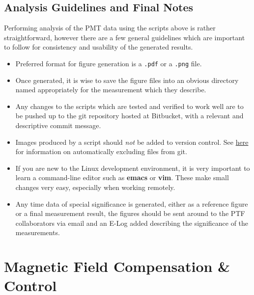 \documentclass[twoside,letterpaper]{refart}
\begin{document}


\clearpage
\subsection{Analysis Guidelines and Final Notes}

Performing analysis of the PMT data using the scripts above is rather straightforward, however there are a few general guidelines which are important to follow for consistency and usability of the generated results.

\begin{itemize}
	\item Preferred format for figure generation is a \texttt{.pdf} or a \texttt{.png} file.
	\item Once generated, it is wise to save the figure files into an obvious directory named appropriately for the measurement which they describe.
	\item Any changes to the scripts which are tested and verified to work well are to be pushed up to the git repository hosted at Bitbucket, with a relevant and descriptive commit message.
	\item Images produced by a script should \emph{not} be added to version control. See \href{https://git-scm.com/docs/gitignore}{here} for information on automatically excluding files from git.
	\item If you are new to the Linux development environment, it is very important to learn a command-line editor such as \textbf{emacs} or \textbf{vim}. These make small changes very easy, especially when working remotely.
	\item Any time data of special significance is generated, either as a reference figure or a final measurement result, the figures should be sent around to the PTF collaborators via email and an E-Log added describing the significance of the measurements.
\end{itemize}

\clearpage

\section{Magnetic Field Compensation \& Control}\label{sec:magField}
\end{document}

